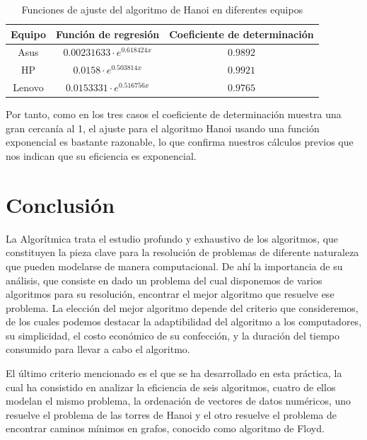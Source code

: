 \documentclass{homework}
\begin{document}
    \begin{table}[H]
        \centering
        \begin{tabular}{|c|c|c|}
            \hline
            Equipo & Función de regresión & Coeficiente de determinación \\
            \hline
            Asus & $0.00231633 \cdot e^{0.618424 x}$ & $0.9892$ \\
            HP & $0.0158 \cdot e^{0.503814 x}$ & $0.9921$ \\
            Lenovo & $0.0153331 \cdot e^{0.516756 x}$ & $0.9765$ \\
            \hline
        \end{tabular}
        \caption{Funciones de ajuste del algoritmo de Hanoi en diferentes equipos}
    \end{table}

    Por tanto, como en los tres casos el coeficiente de determinación muestra una gran cercanía al 1, el ajuste para el algoritmo Hanoi 
    usando una función exponencial es bastante razonable, lo que confirma nuestros cálculos previos que nos indican que su eficiencia es 
    exponencial.

    \newpage
    
    \section{Conclusión}

    La Algorítmica trata el estudio profundo y exhaustivo de los algoritmos, que constituyen la pieza clave para   
    la resolución de problemas de diferente naturaleza que pueden modelarse de manera computacional. De ahí la importancia 
    de su análisis, que consiste en dado un problema del cual disponemos de varios algoritmos para su resolución,
    encontrar el mejor algoritmo que resuelve ese problema. La elección del mejor algoritmo depende del criterio que 
    consideremos, de los cuales podemos destacar la adaptibilidad del algoritmo a los computadores, su simplicidad, el costo 
    económico de su confección, y la duración del tiempo consumido para llevar a cabo el algoritmo. 
    
    El último criterio mencionado es el que se ha desarrollado en esta práctica, la cual ha consistido en analizar la eficiencia
    de seis algoritmos, cuatro de ellos modelan el mismo problema, la ordenación de vectores de datos numéricos, uno resuelve el problema
    de las torres de Hanoi y el otro resuelve el problema de encontrar caminos mínimos en grafos, conocido como algoritmo de Floyd. 
    
\end{document}
